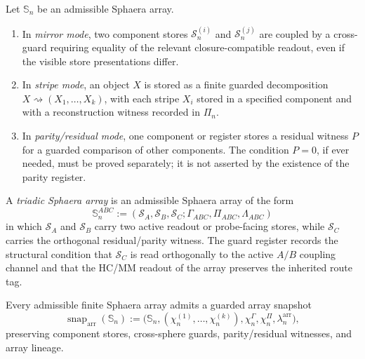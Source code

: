 \begin{definition}\label{def:sphaera-array-modes}
Let \(\mathbb S_n\) be an admissible Sphaera array.
\begin{enumerate}[leftmargin=2em]
 \item In \emph{mirror mode}, two component stores \(\mathcal S_n^{(i)}\) and \(\mathcal S_n^{(j)}\) are coupled by a cross-guard requiring equality of the relevant closure-compatible readout, even if the visible store presentations differ.
 \item In \emph{stripe mode}, an object \(X\) is stored as a finite guarded decomposition \(X\rightsquigarrow(X_1,\ldots,X_k)\), with each stripe \(X_i\) stored in a specified component and with a reconstruction witness recorded in \(\Pi_n\).
 \item In \emph{parity/residual mode}, one component or register stores a residual witness \(P\) for a guarded comparison of other components. The condition \(P=0\), if ever needed, must be proved separately; it is not asserted by the existence of the parity register.
\end{enumerate}
\end{definition}

\begin{definition}\label{def:triadic-sphaera-array}
A \emph{triadic Sphaera array} is an admissible Sphaera array of the form
\[
 \mathbb S_n^{ABC}
 :=
 (\mathcal S_A,\mathcal S_B,\mathcal S_C;\Gamma_{ABC},\Pi_{ABC},\Lambda_{ABC})
\]
in which \(\mathcal S_A\) and \(\mathcal S_B\) carry two active readout or probe-facing stores, while \(\mathcal S_C\) carries the orthogonal residual/parity witness. The guard register records the structural condition that \(\mathcal S_C\) is read orthogonally to the active \(A/B\) coupling channel and that the HC/MM readout of the array preserves the inherited route tag.
\end{definition}

\begin{proposition}\label{prop:sphaera-array-snapshot}
Every admissible finite Sphaera array admits a guarded array snapshot
\[
 \operatorname{snap}_{\mathrm{arr}}(\mathbb S_n)
 :=
 \bigl(\mathbb S_n,(\chi_n^{(1)},\ldots,\chi_n^{(k)}),\chi_n^{\Gamma},\chi_n^{\Pi},\lambda_n^{\mathrm{arr}}\bigr),
\]
preserving component stores, cross-sphere guards, parity/residual witnesses, and array lineage.
\end{proposition}

